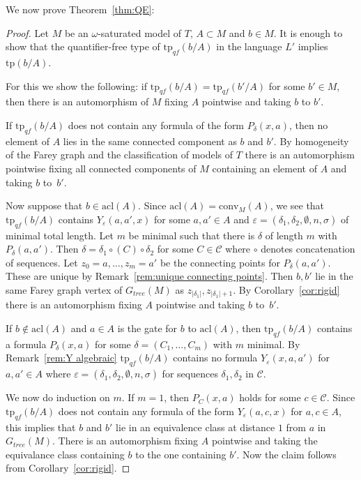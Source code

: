 \documentclass[10pt,a4paper]{amsart}
\renewcommand{\d}{\delta}
\renewcommand{\epsilon}{\varepsilon}
\newcommand{\C}{\mathcal{C}}
\newcommand{\conv}{\mathrm{conv}}
\newcommand{\acl}{\mathrm{acl}}
\newcommand{\tp}{\mathrm{tp}}
\begin{document}
We now prove Theorem~\ref{thm:QE}:
\begin{proof}
Let $M$ be an $\omega$-saturated model of $T$, $A\subset M$ and $b\in M$. It is enough to show that the quantifier-free type of $\tp_{qf}(b/A)$ in the language $L'$ implies $\tp(b/A)$.

For this we show the following: if  $\tp_{qf}(b/A)=\tp_{qf}(b'/A)$ for some $b'\in M$, then there is an automorphism of $M$ fixing $A$ pointwise and taking $b$ to $b'$.

If $\tp_{qf}(b/A)$ does not contain any formula of the form $P_\d(x,a)$, then no element of $A$ lies in the same connected component as $b$ and $b'$. By homogeneity of the Farey graph and the classification of models of $T$ there is an automorphism pointwise fixing all connected components of $M$ containing an element of $A$ and taking $b$ to~$b'$.


Now suppose that $b\in\acl(A)$. Since $\acl(A)=\conv_M(A)$,  we see that $\tp_{qf}(b/A)$ contains $Y_\epsilon(a,a',x)$ for some $a,a'\in A$ and $\epsilon=(\d_1,\d_2,\emptyset,n,\sigma)$ of minimal total length. Let  $m$ be minimal such that there is $\d$ of length $m$ with $P_\d(a,a')$. Then $\d=\d_1\circ(C)\circ\d_2$ for some $C\in\C$ where $\circ$ denotes concatenation of sequences. Let $z_0=a,\ldots, z_m=a'$ be the connecting points for $P_\d(a,a')$. These are unique
by Remark~\ref{rem:unique connecting points}. Then $b,b'$ lie in the same Farey graph vertex of $G_{tree}(M)$ 
as $z_{|\d_1|}, z_{|\d_1|+1}$. By Corollary~\ref{cor:rigid} there is an automorphism fixing $A$ pointwise and taking $b$ to~$b'$.



If $b\notin\acl(A)$ and  $a\in A$ is the gate for $b$ to $\acl(A)$, then $\tp_{qf}(b/A)$ contains a formula $P_\d(x,a)$ for some $\d=(C_1,\ldots, C_m)$ with $m$ minimal. By Remark~\ref{rem:Y algebraic} $\tp_{qf}(b/A)$ contains no formula  $Y_\epsilon(x,a,a')$ for $a,a'\in A$ where $\epsilon=(\d_1,\d_2,\emptyset,n,\sigma)$ for sequences $\d_1,\d_2$ in $\C$.

We now do induction on $m$. If $m=1$, then $P_C(x,a)$ holds for some $c\in\C$. Since  $\tp_{qf}(b/A)$ does not contain any formula of the form $Y_\epsilon(a,c,x)$ for $a,c\in A$, this implies that $b$ and $b'$ lie in an equivalence class at distance $1$ from $a$ in $G_{tree}(M)$. There is an automorphism fixing $A$ pointwise and taking the equivalance class containing $b$ to the one containing $b'$. Now the claim follows from Corollary~\ref{cor:rigid}.


\end{proof}
\end{document}
